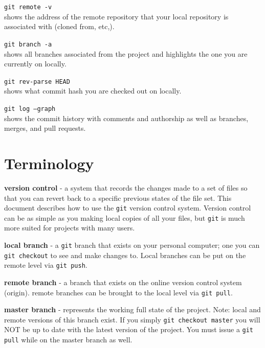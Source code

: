 \documentclass[10pt]{article}
\begin{document}
\texttt{git remote -v} \\
shows the address of the remote repository that your local repository is associated with (cloned from, etc,).

\texttt{git branch -a} \\
shows all branches associated from the project and highlights the one you are currently on locally.

\texttt{git rev-parse HEAD} \\
shows what commit hash you are checked out on locally.

\texttt{git log --graph} \\
shows the commit history with comments and authorship as well as branches, merges, and pull requests.


\section{Terminology}

\textbf{version control} - a system that records the changes made to a set of files so that you can revert back to a specific previous states of the file set. This document describes how to use the \texttt{git} version control system. Version control can be as simple as you making local copies of all your files, but \texttt{git} is much more suited for projects with many users.

\textbf{local branch} -  a \texttt{git} branch that exists on your personal computer; one you can \texttt{git checkout} to see and make changes to. Local branches can be put on the remote level via \texttt{git push}.

\textbf{remote branch} - a branch that exists on the online version control system (origin). remote branches can be brought to the local level via \texttt{git pull}. 

\textbf{master branch} - represents the working full state of the project. Note: local and remote versions of this branch exist. If you simply \texttt{git checkout master} you will NOT be up to date with the latest version of the project. You must issue a \texttt{git pull} while on the master branch as well. 
\end{document}
